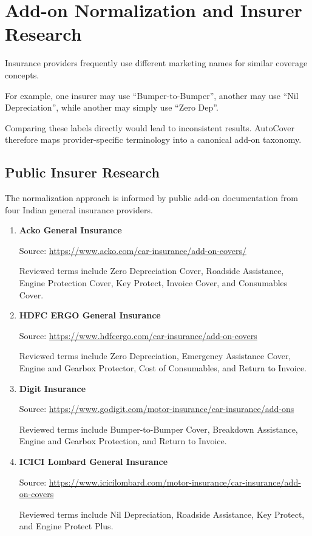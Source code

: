 \documentclass[11pt,a4paper]{article}
\begin{document}
\section{Add-on Normalization and Insurer Research}

Insurance providers frequently use different marketing names
for similar coverage concepts.

For example, one insurer may use ``Bumper-to-Bumper'', another
may use ``Nil Depreciation'', while another may simply use
``Zero Dep''.

Comparing these labels directly would lead to inconsistent
results. AutoCover therefore maps provider-specific terminology
into a canonical add-on taxonomy.

\subsection{Public Insurer Research}

The normalization approach is informed by public add-on
documentation from four Indian general insurance providers.

\begin{enumerate}

    \item \textbf{Acko General Insurance}

    Source:
    \url{https://www.acko.com/car-insurance/add-on-covers/}

    Reviewed terms include Zero Depreciation Cover,
    Roadside Assistance, Engine Protection Cover,
    Key Protect, Invoice Cover, and Consumables Cover.

    \item \textbf{HDFC ERGO General Insurance}

    Source:
    \url{https://www.hdfcergo.com/car-insurance/add-on-covers}

    Reviewed terms include Zero Depreciation,
    Emergency Assistance Cover, Engine and Gearbox Protector,
    Cost of Consumables, and Return to Invoice.

    \item \textbf{Digit Insurance}

    Source:
    \url{https://www.godigit.com/motor-insurance/car-insurance/add-ons}

    Reviewed terms include Bumper-to-Bumper Cover,
    Breakdown Assistance, Engine and Gearbox Protection,
    and Return to Invoice.

    \item \textbf{ICICI Lombard General Insurance}

    Source:
    \url{https://www.icicilombard.com/motor-insurance/car-insurance/add-on-covers}

    Reviewed terms include Nil Depreciation,
    Roadside Assistance, Key Protect, and Engine Protect Plus.

\end{enumerate}
\end{document}
